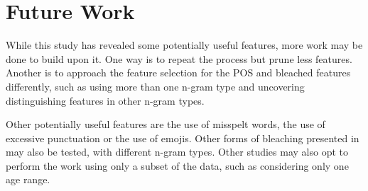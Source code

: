 \section{Future Work}
While this study has revealed some potentially useful features, more work may be done to build upon it. One way is to repeat the process but prune less features. Another is to approach the feature selection for the POS and bleached features differently, such as using more than one n-gram type and uncovering distinguishing features in other n-gram types.

Other potentially useful features are the use of misspelt words, the use of excessive punctuation or the use of emojis. Other forms of bleaching presented in \cite{5} may also be tested, with different n-gram types. Other studies may also opt to perform the work using only a subset of the data, such as considering only one age range.
